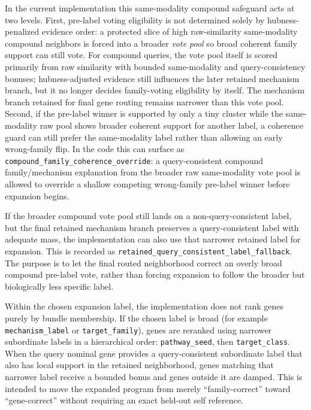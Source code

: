 \documentclass[11pt]{article}
\begin{document}
In the current implementation this same-modality compound safeguard acts at two levels. First, pre-label voting eligibility is not determined solely by hubness-penalized evidence order: a protected slice of high raw-similarity same-modality compound neighbors is forced into a broader \emph{vote pool} so broad coherent family support can still vote. For compound queries, the vote pool itself is scored primarily from raw similarity with bounded same-modality and query-consistency bonuses; hubness-adjusted evidence still influences the later retained mechanism branch, but it no longer decides family-voting eligibility by itself. The mechanism branch retained for final gene routing remains narrower than this vote pool. Second, if the pre-label winner is supported by only a tiny cluster while the same-modality raw pool shows broader coherent support for another label, a coherence guard can still prefer the same-modality label rather than allowing an early wrong-family flip. In the code this can surface as \texttt{compound\_family\_coherence\_override}: a query-consistent compound family/mechanism explanation from the broader raw same-modality vote pool is allowed to override a shallow competing wrong-family pre-label winner before expansion begins.

If the broader compound vote pool still lands on a non-query-consistent label, but the final retained mechanism branch preserves a query-consistent label with adequate mass, the implementation can also use that narrower retained label for expansion. This is recorded as \texttt{retained\_query\_consistent\_label\_fallback}. The purpose is to let the final routed neighborhood correct an overly broad compound pre-label vote, rather than forcing expansion to follow the broader but biologically less specific label.

Within the chosen expansion label, the implementation does not rank genes purely by bundle membership. If the chosen label is broad (for example \texttt{mechanism\_label} or \texttt{target\_family}), genes are reranked using narrower subordinate labels in a hierarchical order: \texttt{pathway\_seed}, then \texttt{target\_class}. When the query nominal gene provides a query-consistent subordinate label that also has local support in the retained neighborhood, genes matching that narrower label receive a bounded bonus and genes outside it are damped. This is intended to move the expanded program from merely ``family-correct'' toward ``gene-correct'' without requiring an exact held-out self reference.
\end{document}

